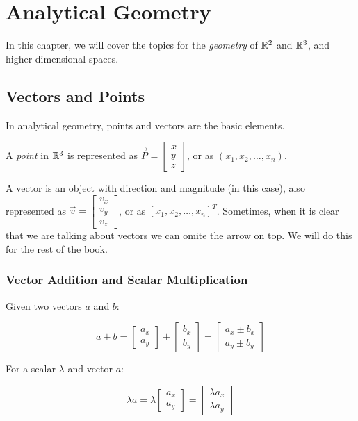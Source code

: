 \chapter{Analytical Geometry}

In this chapter, we will cover the topics for the \emph{geometry} of \(\mathbb{R}^2\) and \(\mathbb{R}^3\), and higher dimensional spaces.

\section{Vectors and Points}

In analytical geometry, points and vectors are the basic elements.

A \emph{point} in \(\mathbb{R}^3\) is represented as \(\vec{P} = \begin{bmatrix} x \\ y \\ z \end{bmatrix}\),
or as \((x_1, x_2, \dots , x_n)\).

A vector is an object with direction and magnitude (in this case), also represented as \(\vec{v} = \begin{bmatrix} v_x \\ v_y \\ v_z \end{bmatrix}\),
or as \({[x_1, x_2, \dots , x_n]}^{T}\). Sometimes, when it is clear that we are talking about vectors we can omite the arrow on top. We will do this 
for the rest of the book.

\subsection{Vector Addition and Scalar Multiplication}

Given two vectors \(a\) and \(b\):

\[
	a \pm  b = \begin{bmatrix} a_x \\ a_y \end{bmatrix} \pm \begin{bmatrix} b_x \\ b_y \end{bmatrix} = 
	\begin{bmatrix} a_x \pm b_x \\ a_y \pm b_y \end{bmatrix}
\]

For a scalar \(\lambda\) and vector \(a\):

\[
	\lambda a = \lambda \begin{bmatrix} a_x \\ a_y \end{bmatrix} = \begin{bmatrix} \lambda a_x \\ \lambda a_y \end{bmatrix}
\]

